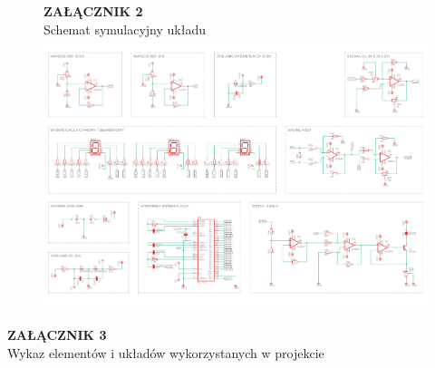 \documentclass[12pt]{article}
\begin{document}
\begin{figure}
	\centering
	\LARGE \textbf{ZAŁĄCZNIK 2} \\
	\large Schemat symulacyjny układu 
	\includegraphics[scale=0.82, origin=c]{ammeter.png}
\end{figure}

\newpage
\begin{center}
\LARGE \textbf{ZAŁĄCZNIK 3} \\
\large Wykaz elementów i układów wykorzystanych w projekcie \\
\end{center}
\end{document}
